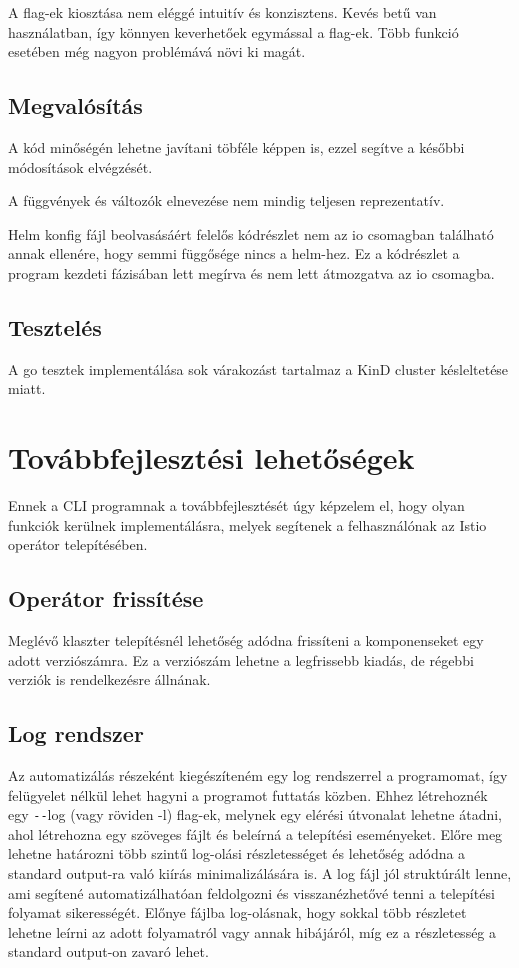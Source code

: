 A flag-ek kiosztása nem eléggé intuitív és konzisztens. Kevés betű van használatban, így könnyen keverhetőek egymással a flag-ek.
Több funkció esetében még nagyon problémává növi ki magát.

\subsection*{Megvalósítás}
A kód minőségén lehetne javítani töbféle képpen is, ezzel segítve a későbbi módosítások elvégzését.

A függvények és változók elnevezése nem mindig teljesen reprezentatív.

Helm konfig fájl beolvasásáért felelős kódrészlet nem az io csomagban található annak ellenére, hogy semmi függősége nincs a helm-hez.
Ez a kódrészlet a program kezdeti fázisában lett megírva és nem lett átmozgatva az io csomagba.

\subsection*{Tesztelés}
A go tesztek implementálása sok várakozást tartalmaz a KinD cluster késleltetése miatt.


\section{Továbbfejlesztési lehetőségek}
Ennek a CLI programnak a továbbfejlesztését úgy képzelem el, hogy olyan funkciók kerülnek implementálásra, melyek segítenek a felhasználónak az Istio operátor telepítésében.

\subsection{Operátor frissítése}
Meglévő klaszter telepítésnél lehetőség adódna frissíteni a komponenseket egy adott verziószámra.
Ez a verziószám lehetne a legfrissebb kiadás, de régebbi verziók is rendelkezésre állnának.

\subsection{Log rendszer}
Az automatizálás részeként kiegészíteném egy log rendszerrel a programomat, így felügyelet nélkül lehet hagyni a programot futtatás közben.
Ehhez létrehoznék egy \texttt{-{}-}log (vagy röviden -l) flag-ek, melynek egy elérési útvonalat lehetne átadni, ahol létrehozna egy szöveges fájlt és beleírná a telepítési eseményeket. Előre meg lehetne határozni több szintű log-olási részletességet és lehetőség adódna a standard output-ra való kiírás minimalizálására is.
A log fájl jól struktúrált lenne, ami segítené automatizálhatóan feldolgozni és visszanézhetővé tenni a telepítési folyamat sikerességét.
Előnye fájlba log-olásnak, hogy sokkal több részletet lehetne leírni az adott folyamatról vagy annak hibájáról, míg ez a részletesség a standard output-on zavaró lehet.

